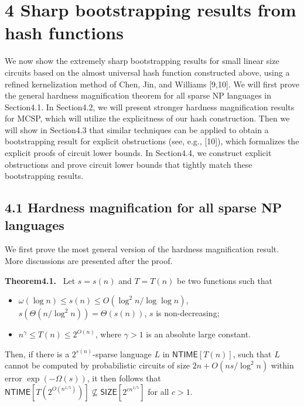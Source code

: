 \documentclass[10pt,a4paper]{article}
\newenvironment{authorclaim}[1]{\par\medskip\noindent\textbf{#1.}\ }{\par\medskip}
\begin{document}
\section*{4 Sharp bootstrapping results from hash functions}
We now show the extremely sharp bootstrapping results for small linear size circuits based on the almost universal hash function constructed above, using a refined kernelization method of Chen, Jin, and Williams [9,10].
We will first prove the general hardness magnification theorem for all sparse NP languages in Section4.1. In Section4.2, we will present stronger hardness magnification results for MCSP, which will utilize the explicitness of our hash construction. Then we will show in Section4.3 that similar techniques can be applied to obtain a bootstrapping result for explicit obstructions (see, e.g., [10]), which formalizes the explicit proofs of circuit lower bounds. In Section4.4, we construct explicit obstructions and prove circuit lower bounds that tightly match these bootstrapping results.
\subsection*{4.1 Hardness magnification for all sparse NP languages}
We first prove the most general version of the hardness magnification result. More discussions are presented after the proof.

\begin{authorclaim}{Theorem4.1}
Let $s=s(n)$ and $T=T(n)$ be two functions such that
\begin{itemize}
\item $\omega(\log n)\le s(n)\le O(\log^2n/\log\log n)$, $s(\Theta(n/\log^2n))=\Theta(s(n))$, $s$ is non-decreasing;
\item $n^\gamma\le T(n)\le2^{O(n)}$, where $\gamma>1$ is an absolute large constant.
\end{itemize}
Then, if there is a $2^{s(n)}$-sparse language $L$ in $\mathsf{NTIME}[T(n)]$, such that $L$ cannot be computed by probabilistic circuits of size $2n+O(ns/\log^2n)$ within error $\exp(-\Omega(s))$, it then follows that $\mathsf{NTIME}[T(2^{O(n^{1/5})})]\not\subseteq\mathsf{SIZE}[2^{cn^{1/5}}]$ for all $c>1$.
\end{authorclaim}
\end{document}
